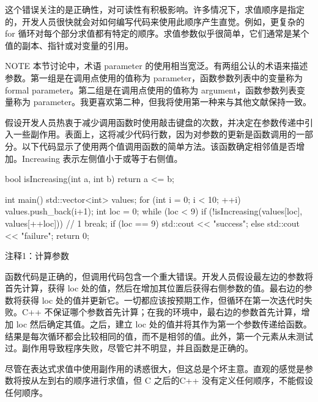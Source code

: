 这个错误关注的是正确性，对可读性有积极影响。许多情况下，求值顺序是指定的，开发人员很快就会对如何编写代码来使用此顺序产生直觉。例如，更复杂的 for 循环对每个部分求值都有特定的顺序。求值参数似乎很简单，它们通常是某个值的副本、指针或对变量的引用。

\begin{myNotic}{NOTE}
本节讨论中，术语 parameter 的使用相当宽泛。有两组公认的术语来描述参数。第一组是在调用点使用的值称为 parameter，函数参数列表中的变量称为 formal parameter。第二组是在调用点使用的值称为 argument，函数参数列表变量称为 parameter。我更喜欢第二种，但我将使用第一种来与其他文献保持一致。
\end{myNotic}


假设开发人员热衷于减少调用函数时使用敲击键盘的次数，并决定在参数传递中引入一些副作用。表面上，这将减少代码行数，因为对参数的更新是函数调用的一部分。以下代码显示了使用两个值调用函数的简单方法。该函数确定相邻值是否增加。Increasing 表示左侧值小于或等于右侧值。


\begin{cpp}
bool isIncreasing(int a, int b) {
  return a <= b;
}

int main() {
  std::vector<int> values;
  for (int i = 0; i < 10; ++i)
    values.push_back(i+1);
  int loc = 0;
  while (loc < 9) {
    if (!isIncreasing(values[loc], values[++loc])) // 1
      break;
  }
  if (loc == 9)
    std::cout << "success\n";
  else
    std::cout << "failure\n";
  return 0;
}
\end{cpp}

{\footnotesize
注释1：计算参数
}


函数代码是正确的，但调用代码包含一个重大错误。开发人员假设最左边的参数将首先计算，获得 loc 处的值，然后在增加其位置后获得右侧参数的值。最右边的参数将获得 loc 处的值并更新它。一切都应该按预期工作，但循环在第一次迭代时失败。C++ 不保证哪个参数首先计算；在我的环境中，最右边的参数首先计算，增加 loc 然后确定其值。之后，建立 loc 处的值并将其作为第一个参数传递给函数。结果是每次循环都会比较相同的值，而不是相邻的值。此外，第一个元素从未测试过。副作用导致程序失败，尽管它并不明显，并且函数是正确的。


尽管在表达式求值中使用副作用的诱惑很大，但这总是个坏主意。直观的感觉是参数将按从左到右的顺序进行求值，但 C 之后的C++ 没有定义任何顺序，不能假设任何顺序。

